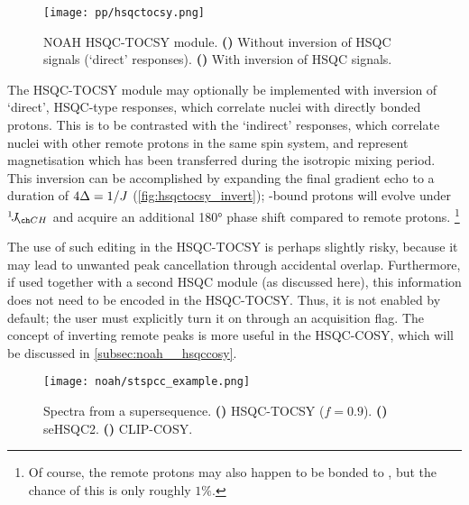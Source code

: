 \begin{figure}[!ht]
    \centering
    \texttt{[image: pp/hsqctocsy.png]}%
    {\label{fig:hsqctocsy_base}}%
    {\label{fig:hsqctocsy_invert}}%
    \caption[NOAH HSQC-TOCSY module]{
        NOAH HSQC-TOCSY module.
        \textbf{()} Without inversion of HSQC signals (`direct' responses).
        \textbf{()} With inversion of HSQC signals.
    }
    \label{fig:hsqctocsy}
\end{figure}

The HSQC-TOCSY module may optionally be implemented with inversion of `direct', HSQC-type responses, which correlate \carbon{} nuclei with directly bonded protons.
This is to be contrasted with the `indirect' responses, which correlate \carbon{} nuclei with other remote protons in the same spin system, and represent magnetisation which has been transferred during the isotropic mixing period.
This inversion can be accomplished by expanding the final gradient echo to a duration of $4\Delta = 1/J\/$ (\cref{fig:hsqctocsy_invert}); \carbon{}-bound protons will evolve under $\oneJ{CH}$ and acquire an additional \ang{180} phase shift compared to remote protons.%
\footnote{Of course, the remote protons may also happen to be bonded to \carbon{}, but the chance of this is only roughly $1\%$.}

The use of such editing in the HSQC-TOCSY is perhaps slightly risky, because it may lead to unwanted peak cancellation through accidental overlap.
Furthermore, if used together with a second HSQC module (as discussed here), this information does not need to be encoded in the HSQC-TOCSY.
Thus, it is not enabled by default; the user must explicitly turn it on through an acquisition flag.
The concept of inverting remote peaks is more useful in the HSQC-COSY, which will be discussed in \cref{subsec:noah__hsqccosy}.

\begin{figure}[!ht]
    \centering
    \texttt{[image: noah/stspcc\_example.png]}%
    {\label{fig:stspcc_example_st}}%
    {\label{fig:stspcc_example_sp}}%
    {\label{fig:stspcc_example_cc}}%
    \caption[Spectra from a  supersequence]{
        Spectra from a  supersequence.
        \textbf{()} HSQC-TOCSY ($f = 0.9$).
        \textbf{()} seHSQC2.
        \textbf{()} CLIP-COSY.
    }
    \label{fig:stspcc_example}
\end{figure}

